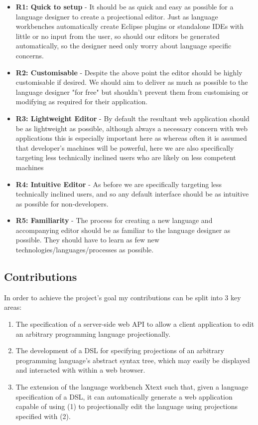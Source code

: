\documentclass{article}
\begin{document}
\begin{itemize}
\item{\textbf{R1: Quick to setup} - It should be as quick and easy as possible for a language designer to create a projectional editor. Just as language workbenches automatically create Eclipse plugins or standalone IDEs with little or no input from the user, so should our editors be generated automatically, so the designer need only worry about language specific concerns.}
\item{\textbf{R2: Customisable} - Despite the above point the editor should be highly customisable if desired. We should aim to deliver as much as possible to the language designer "for free" but shouldn't prevent them from customising or modifying as required for their application. }
\item{\textbf{R3: Lightweight Editor} - By default the resultant web application should be as lightweight as possible, although always a necessary concern with web applications this is especially important here as whereas often it is assumed that developer's machines will be powerful, here we are also specifically targeting less technically inclined users who are likely on less competent machines}
\item{\textbf{R4: Intuitive Editor} - As before we are specifically targeting less technically inclined users, and so any default interface should be as intuitive as possible for non-developers.}
\item{\textbf{R5: Familiarity} - The process for creating a new language and accompanying editor should be as familiar to the language designer as possible. They should have to learn as few new technologies/languages/processes as possible.}
\end{itemize}

\subsection{Contributions}

In order to achieve the project's goal my contributions can be split into 3 key areas:

\begin{enumerate}
\item The specification of a server-side web API to allow a client application to edit an arbitrary programming language projectionally.
\item The development of a DSL for specifying projections of an arbitrary programming language's abstract syntax tree, which may easily be displayed and interacted with within a web browser.
\item The extension of the language workbench Xtext such that, given a language specification of a DSL, it can automatically generate a web application capable of using (1) to projectionally edit the language using projections specified with (2).
\end{enumerate}
\end{document}
